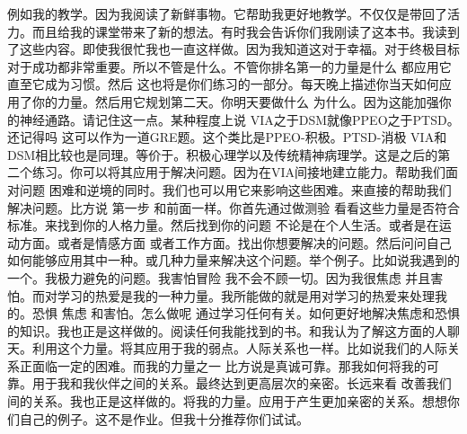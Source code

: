 例如我的教学。因为我阅读了新鲜事物。它帮助我更好地教学。不仅仅是带回了活力。而且给我的课堂带来了新的想法。有时我会告诉你们我刚读了这本书。我读到了这些内容。即使我很忙我也一直这样做。因为我知道这对于幸福。对于终极目标 对于成功都非常重要。所以不管是什么。不管你排名第一的力量是什么 都应用它直至它成为习惯。然后 这也将是你们练习的一部分。每天晚上描述你当天如何应用了你的力量。然后用它规划第二天。你明天要做什么 为什么。因为这能加强你的神经通路。请记住这一点。某种程度上说 VIA之于DSM就像PPEO之于PTSD。还记得吗 这可以作为一道GRE题。这个类比是PPEO-积极。PTSD-消极 VIA和DSM相比较也是同理。等价于。积极心理学以及传统精神病理学。这是之后的第二个练习。你可以将其应用于解决问题。因为在VIA间接地建立能力。帮助我们面对问题 困难和逆境的同时。我们也可以用它来影响这些困难。来直接的帮助我们解决问题。比方说 第一步 和前面一样。你首先通过做测验 看看这些力量是否符合标准。来找到你的人格力量。然后找到你的问题 不论是在个人生活。或者是在运动方面。或者是情感方面 或者工作方面。找出你想要解决的问题。然后问问自己如何能够应用其中一种。或几种力量来解决这个问题。举个例子。比如说我遇到的一个。我极力避免的问题。我害怕冒险 我不会不顾一切。因为我很焦虑 并且害怕。而对学习的热爱是我的一种力量。我所能做的就是用对学习的热爱来处理我的。恐惧 焦虑 和害怕。怎么做呢 通过学习任何有关。如何更好地解决焦虑和恐惧的知识。我也正是这样做的。阅读任何我能找到的书。和我认为了解这方面的人聊天。利用这个力量。将其应用于我的弱点。人际关系也一样。比如说我们的人际关系正面临一定的困难。而我的力量之一 比方说是真诚可靠。那我如何将我的可靠。用于我和我伙伴之间的关系。最终达到更高层次的亲密。长远来看 改善我们间的关系。我也正是这样做的。将我的力量。应用于产生更加亲密的关系。想想你们自己的例子。这不是作业。但我十分推荐你们试试。 

